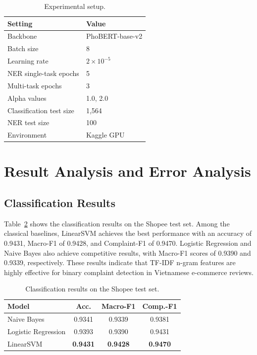 \documentclass[11pt]{article}
\begin{document}
\begin{table}[t]
\centering
\small
\begin{tabular}{ll}
\toprule
Setting & Value \\
\midrule
Backbone & PhoBERT-base-v2 \\
Batch size & 8 \\
Learning rate & \(2 \times 10^{-5}\) \\
NER single-task epochs & 5 \\
Multi-task epochs & 3 \\
Alpha values & 1.0, 2.0 \\
Classification test size & 1,564 \\
NER test size & 100 \\
Environment & Kaggle GPU \\
\bottomrule
\end{tabular}
\caption{Experimental setup.}
\label{tab:setup}
\end{table}

\section{Result Analysis and Error Analysis}

\subsection{Classification Results}

Table~\ref{tab:classification} shows the classification results on the Shopee test set. Among the classical baselines, LinearSVM achieves the best performance with an accuracy of 0.9431, Macro-F1 of 0.9428, and Complaint-F1 of 0.9470. Logistic Regression and Naive Bayes also achieve competitive results, with Macro-F1 scores of 0.9390 and 0.9339, respectively. These results indicate that TF-IDF n-gram features are highly effective for binary complaint detection in Vietnamese e-commerce reviews.

\begin{table}[t]
\centering
\small
\begin{tabular}{lccc}
\toprule
Model & Acc. & Macro-F1 & Comp.-F1 \\
\midrule
Naive Bayes & 0.9341 & 0.9339 & 0.9381 \\
Logistic Regression & 0.9393 & 0.9390 & 0.9431 \\
LinearSVM & \textbf{0.9431} & \textbf{0.9428} & \textbf{0.9470} \\
\bottomrule
\end{tabular}
\caption{Classification results on the Shopee test set.}
\label{tab:classification}
\end{table}
\end{document}
